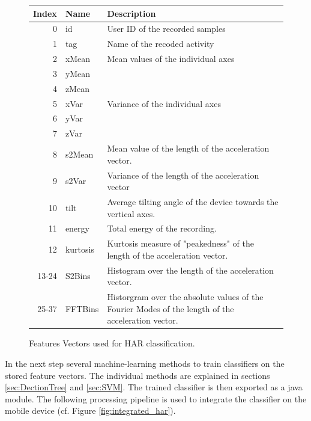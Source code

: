 \begin{figure}
\centering
\begin{tabular}{|r|l|p{10cm}|} \hline
Index & Name     & Description \\ \hline
0            & id       & User ID of the recorded samples \\ \hline
1            & tag      & Name of the recoded activity    \\ \hline
2            & xMean    & Mean values of the individual axes \\ 
3            & yMean    &             \\ 
4            & zMean    &             \\ \hline
5            & xVar     & Variance of the individual axes  \\ 
6            & yVar     &             \\ 
7            & zVar     &             \\ \hline
8            & s2Mean   & Mean value of the length of the acceleration
                          vector. \\ \hline
9            & s2Var    & Variance of the length of the acceleration
                          vector \\ \hline
10           & tilt     & Average tilting angle of the device towards
                          the vertical axes. \\ \hline
11           & energy   & Total energy of the recording.  \\ \hline
12           & kurtosis & Kurtosis measure of "peakedness" of the
                          length of the acceleration vector. \\ \hline
13-24        & S2Bins   & Histogram over the length of the
                          acceleration vector. \\ \hline
25-37        & FFTBins  & Historgram over the absolute values of the
                          Fourier Modes of the length of the
                          acceleration vector. \\ \hline
\end{tabular}
\caption{Features Vectors used for HAR classification.}
\label{fig:har_features}
\end{figure}


In the next step several machine-learning methods to train classifiers
on the stored feature vectors. The individual methods are explained in
sections \ref{sec:DectionTree} and \ref{sec:SVM}.  The trained
classifier is then exported as a java module. The following processing
pipeline is used to integrate the classifier on the mobile device
(cf. Figure \ref{fig:integrated_har}).


